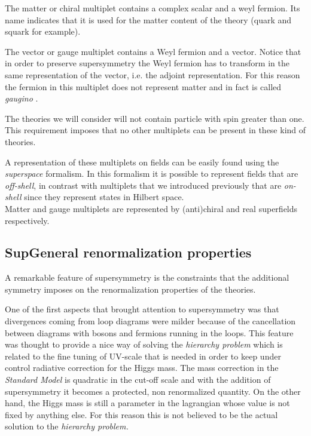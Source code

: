 The matter or chiral multiplet contains a complex scalar and a weyl fermion. Its name indicates that it is used for the matter content of the theory (quark and squark for example).

The vector or gauge multiplet contains a Weyl fermion and a vector. 
Notice that in order to preserve supersymmetry the Weyl fermion has to transform in the same representation of the vector, i.e. the adjoint representation.
For this reason the fermion in this multiplet does not represent matter and in fact is called \emph{gaugino} .

The theories we will consider will not contain particle with spin greater than one.
This requirement imposes that no other multiplets can be present in these kind of theories.

A representation of these multiplets on fields can be easily found using the \emph{superspace} formalism.
In this formalism it is possible to represent fields  that are \emph{off-shell}, in contrast with multiplets that we introduced previously that are \emph{on-shell} since they represent states in Hilbert space.\\
Matter and gauge multiplets are represented by (anti)chiral and real superfields respectively.



\subsection{ SupGeneral renormalization properties}

A remarkable feature of supersymmetry is the constraints that the additional symmetry imposes on the renormalization properties of the theories.

One of the first aspects that brought attention to supersymmetry was that divergences coming from loop diagrams were milder because of the cancellation between diagrams with bosons and fermions running in the loops. 
This feature was thought to provide a nice way of solving the \emph{hierarchy problem} which is related to the fine tuning of UV-scale that is needed in order to keep under control radiative correction for the Higgs mass.
The mass correction in the \emph{Standard Model} is quadratic in the cut-off scale and with the addition of supersymmetry it becomes a protected, non renormalized quantity. 
On the other hand, the Higgs mass is still a parameter in the lagrangian whose value is not fixed by anything else.
For this reason this is not believed to be the actual solution to the \emph{hierarchy problem.} 

